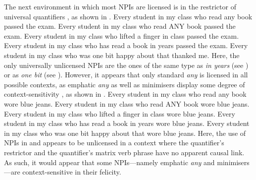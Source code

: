 The next environment in which most NPIs are licensed is in the restrictor of universal quantifiers \parencite{Ladusaw1980,Wouden1997}, as shown in .
\pex[nopreamble=true]\label{ex:npi-every-okay}%
\a{} Every student in my class who read any book passed the exam.
\a{} Every student in my class who read \MakeUppercase{any} book passed the exam.
\a{} Every student in my class who lifted a finger in class passed the exam.
\a{}\ljudge{\#} Every student in my class who has read a book in years passed the exam.
\a{}\ljudge{\#} Every student in my class who was one bit happy about that thanked me.
\xe
Here, the only universally unlicensed NPIs are the ones of the same type as \textit{in years} (see ) or as \textit{one bit} (see ). However, it appears that only standard \textit{any} is licensed in all possible contexts, as emphatic \textit{any} as well as minimisers display some degree of context-sensitivity \parencite{Heim1984,Schwarz2000,Crnic2011,Crnic2014-dogma,Crnic2014-nm}, as shown in .
\pex[nopreamble=true]\label{ex:npi-every-bad}%
\a{} Every student in my class who read any book wore blue jeans.
\a{}\ljudge{\#} Every student in my class who read \MakeUppercase{any} book wore blue jeans.
\a{}\ljudge{\#} Every student in my class who lifted a finger in class wore blue jeans.
\a{}\ljudge{\#} Every student in my class who has read a book in years wore blue jeans.
\a{}\ljudge{\#} Every student in my class who was one bit happy about that wore blue jeans.
\xe
Here, the use of NPIs in  and  appears to be unlicensed in a context where the quantifier's restrictor and the quantifier's matrix verb phrase have no apparent causal link. As such, it would appear that some NPIs---namely emphatic \textit{any} and minimisers---are context-sensitive in their felicity.

